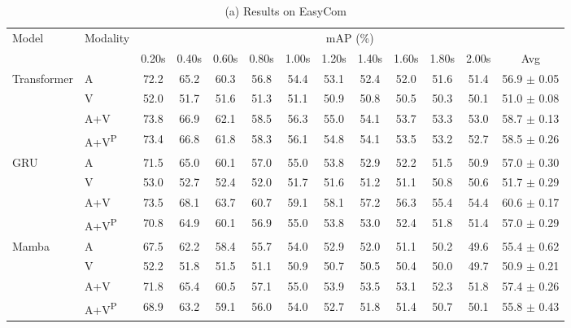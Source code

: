 \begin{table*}[t]
\centering
\footnotesize

\begin{subtable}{\textwidth}
\centering
\begin{adjustbox}{width=\textwidth, center}
\begin{tabular}{llccccccccccc}
\toprule
\multirow{2}{*}{Model} & \multirow{2}{*}{Modality} & \multicolumn{11}{c}{mAP (\%)} \\
\cmidrule(lr){3-13}
 & & 0.20s & 0.40s & 0.60s & 0.80s & 1.00s & 1.20s & 1.40s & 1.60s & 1.80s & 2.00s & Avg \\
\midrule
\multirow{4}{*}{\centering Transformer} 
 & A & 72.2 & 65.2 & 60.3 & 56.8 & 54.4 & 53.1 & 52.4 & 52.0 & 51.6 & 51.4  & 56.9 $\pm$ 0.05 
 \\
 & V & 52.0 & 51.7 & 51.6 & 51.3 & 51.1 & 50.9 & 50.8 & 50.5 & 50.3 & 50.1  & 51.0 $\pm$ 0.08 
 \\
 & A+V & 73.8 & 66.9 & 62.1 & 58.5 & 56.3 & 55.0 & 54.1 & 53.7 & 53.3 & 53.0 & 58.7 $\pm$ 0.13
 \\
 & A+V\textsuperscript{P} & 73.4 & 66.8 & 61.8 & 58.3 & 56.1 & 54.8 & 54.1 & 53.5 & 53.2 & 52.7  & 58.5 $\pm$ 0.26 
 \\
\midrule
\multirow{4}{*}{\centering GRU} 
 & A & 71.5 & 65.0 & 60.1 & 57.0 & 55.0 & 53.8 & 52.9 & 52.2 & 51.5 & 50.9  & 57.0 $\pm$ 0.30 
 \\
 & V & 53.0 & 52.7 & 52.4 & 52.0 & 51.7 & 51.6 & 51.2 & 51.1 & 50.8 & 50.6 & 51.7 $\pm$ 0.29 
 \\
 & A+V & 73.5 & 68.1 & 63.7 & 60.7 & 59.1 & 58.1 & 57.2 & 56.3 & 55.4 & 54.4 & 60.6 $\pm$ 0.17 
 \\
 & A+V\textsuperscript{P} & 70.8 & 64.9 & 60.1 & 56.9 & 55.0 & 53.8 & 53.0 & 52.4 & 51.8 & 51.4 & 57.0 $\pm$ 0.29 
 \\
\midrule
\multirow{4}{*}{\centering Mamba} 
 & A & 67.5 & 62.2 & 58.4 & 55.7 & 54.0 & 52.9 & 52.0 & 51.1 & 50.2 & 49.6 & 55.4 $\pm$ 0.62 
 \\
 & V & 52.2 & 51.8 & 51.5 & 51.1 & 50.9 & 50.7 & 50.5 & 50.4 & 50.0 & 49.7 & 50.9 $\pm$ 0.21 
 \\
 & A+V & 71.8 & 65.4 & 60.5 & 57.1 & 55.0 & 53.9 & 53.5 & 53.1 & 52.3 & 51.8 & 57.4 $\pm$ 0.26 
 \\
 & A+V\textsuperscript{P} & 68.9 & 63.2 & 59.1 & 56.0 & 54.0 & 52.7 & 51.8 & 51.4 & 50.7 & 50.1 & 55.8 $\pm$ 0.43 
 \\
\bottomrule
\end{tabular}
\end{adjustbox}
\label{tab:main_result_a}
\caption*{(a) Results on EasyCom} %
\end{subtable}



\end{table*}
